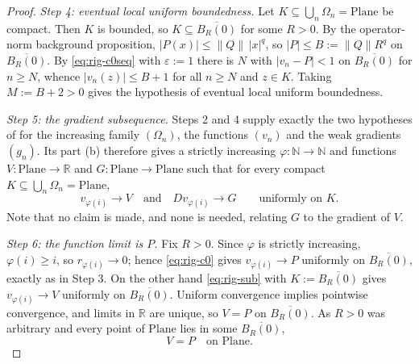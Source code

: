 \begin{proof}
\emph{Step 4: eventual local uniform boundedness.}  Let $K\subseteq\bigcup_n\Omega_n=\mathrm{Plane}$
be compact.  Then $K$ is bounded, so $K\subseteq\overline{B_R(0)}$ for some $R>0$.  By the
operator-norm background proposition, $\lvert P(x)\rvert\le\lVert Q\rVert\,\lvert x\rvert^{q}$,
so $\lvert P\rvert\le B:=\lVert Q\rVert R^{q}$ on $\overline{B_R(0)}$.  By
\eqref{eq:rig-c0seq} with $\varepsilon:=1$ there is $N$ with $\lvert v_n-P\rvert<1$ on
$\overline{B_R(0)}$ for $n\ge N$, whence $\lvert v_n(z)\rvert\le B+1$ for all $n\ge N$ and
$z\in K$.  Taking $M:=B+2>0$ gives the hypothesis of eventual local uniform boundedness.

\emph{Step 5: the gradient subsequence.}  Steps 2 and 4 supply exactly the two hypotheses of
 for the increasing family $(\Omega_n)$, the functions
$(v_n)$ and the weak gradients $(g_n)$.  Its part (b) therefore gives a strictly increasing
$\varphi\colon\mathbb{N}\to\mathbb{N}$ and functions $V\colon\mathrm{Plane}\to\mathbb{R}$ and
$G\colon\mathrm{Plane}\to\mathrm{Plane}$ such that for every compact
$K\subseteq\bigcup_n\Omega_n=\mathrm{Plane}$,
\begin{equation}\label{eq:rig-sub}
  v_{\varphi(i)}\to V\quad\text{and}\quad Dv_{\varphi(i)}\to G\qquad\text{uniformly on }K .
\end{equation}
Note that no claim is made, and none is needed, relating $G$ to the gradient of $V$.

\emph{Step 6: the function limit is $P$.}  Fix $R>0$.  Since $\varphi$ is strictly increasing,
$\varphi(i)\ge i$, so $r_{\varphi(i)}\to0$; hence \eqref{eq:rig-c0} gives
$v_{\varphi(i)}\to P$ uniformly on $\overline{B_R(0)}$, exactly as in Step 3.  On the other
hand \eqref{eq:rig-sub} with $K:=\overline{B_R(0)}$ gives $v_{\varphi(i)}\to V$ uniformly on
$\overline{B_R(0)}$.  Uniform convergence implies pointwise convergence, and limits in
$\mathbb{R}$ are unique, so $V=P$ on $\overline{B_R(0)}$.  As $R>0$ was arbitrary and every
point of $\mathrm{Plane}$ lies in some $\overline{B_R(0)}$,
\begin{equation}\label{eq:rig-VP}
  V=P\quad\text{on }\mathrm{Plane}.
\end{equation}


\end{proof}
